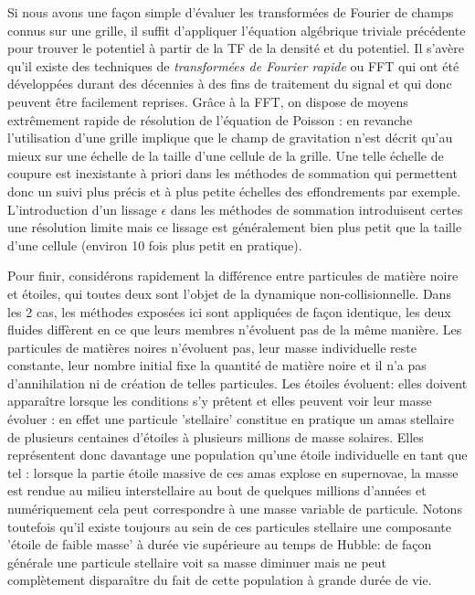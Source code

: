 Si nous avons une façon simple d'évaluer les transformées de Fourier de champs connus sur une grille, il suffit d'appliquer l'équation algébrique triviale précédente pour trouver le potentiel à partir de la TF de la densité et du potentiel. Il s'avère qu'il existe des techniques de \textit{transformées de Fourier rapide} ou FFT qui ont été développées durant des décennies à des fins de traitement du signal et qui donc peuvent être facilement reprises. Grâce à la FFT, on dispose de moyens extrêmement rapide de résolution de l'équation de Poisson : en revanche l'utilisation d'une grille implique que le champ de gravitation n'est décrit qu'au mieux sur une échelle de la taille d'une cellule de la grille. Une telle échelle de coupure est inexistante à priori dans les méthodes de sommation qui permettent donc un suivi plus précis et à plus petite échelles des effondrements par exemple. L'introduction d'un lissage $\epsilon$ dans les méthodes de sommation introduisent certes une résolution limite mais ce lissage est généralement bien plus petit que la taille d'une cellule (environ 10 fois plus petit en pratique).

Pour finir, considérons rapidement la différence entre particules de matière noire et étoiles, qui toutes deux sont l'objet de la dynamique non-collisionnelle. Dans les 2 cas, les méthodes exposées ici sont appliquées de façon identique, les deux fluides diffèrent en ce que leurs membres n'évoluent pas de la même manière. Les particules de matières noires n'évoluent pas, leur masse individuelle reste constante, leur nombre initial fixe la quantité de matière noire et il n'a pas d'annihilation ni de création de telles particules. Les étoiles évoluent: elles doivent apparaître lorsque les conditions s'y prêtent et elles peuvent voir leur masse évoluer : en effet une particule 'stellaire' constitue en pratique un amas stellaire  de plusieurs centaines d'étoiles à plusieurs millions de masse solaires. Elles représentent donc davantage une population qu'une étoile individuelle en tant que tel : lorsque la partie étoile massive de ces amas explose en supernovae, la masse est rendue au milieu interstellaire au bout de quelques millions d'années et numériquement cela peut correspondre à une masse variable de particule. Notons toutefois qu'il existe toujours au sein de ces particules stellaire une composante 'étoile de faible masse' à durée vie supérieure au temps de Hubble: de façon générale une particule stellaire voit sa masse diminuer mais ne peut complètement disparaître du fait de cette population à grande durée de vie.

